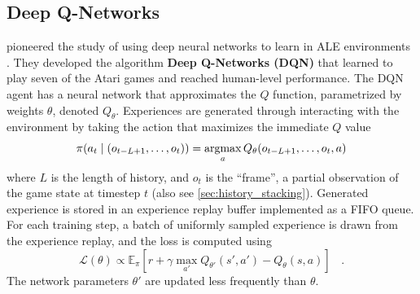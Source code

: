 \subsection{Deep Q-Networks} \label{sec:dqn}
\citeauthor{PlayingAtariDeep_Mnih.Kavukcuoglu.ea_2013} pioneered the study of using deep neural networks to learn in ALE environments \cite{PlayingAtariDeep_Mnih.Kavukcuoglu.ea_2013}.
They developed the algorithm \textbf{Deep Q-Networks (DQN)} that learned to play seven of the Atari games and reached human-level performance.
The DQN agent has a neural network that approximates the $Q$ function, parametrized by weights $\theta$, denoted $Q_\theta$.
Experiences are generated through interacting with the environment by taking the action that maximizes the immediate $Q$ value
\begin{align*}
    \pi(a_t \mid (o_{t - L + 1}, \dots, o_t)) = \operatorname*{argmax}_{a}{Q_{\theta}(o_{t - L + 1}, \dots, o_t, a)}
\end{align*}
where $L$ is the length of history, and $o_t$ is the ``frame'', a partial observation of the game state at timestep $t$ (also see \ref{sec:history_stacking}).
Generated experience is stored in an experience replay buffer implemented as a FIFO queue.
For each training step, a batch of uniformly sampled experience is drawn from the experience replay, and the loss is computed using
\begin{equation*}
    \mathcal{L}(\theta) \propto \mathbb{E}_\pi\left[r + \gamma \max _{a'} Q_{\theta'}(s', a') - Q_{\theta}(s, a) \right] ~~~~ .
\end{equation*}
The network parameters $\theta'$ are updated less frequently than $\theta$.

